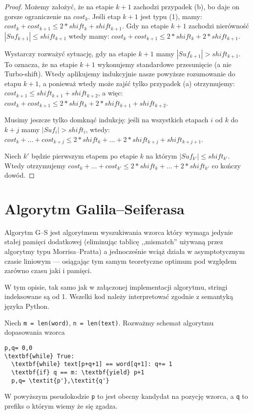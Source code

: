 \begin{proof}
	Możemy założyć, że na etapie $k+1$ zachodzi przypadek (b), bo daje on gorsze ograniczenie na $cost_k$. Jeśli etap $k+1$ jest typu (1), mamy: $cost_k + cost_{k+1} \leq 2 * shift_k + shift_{k+1}$. Gdy na etapie $k+1$ zachodzi nierówność $|Suf_{k+1}| \leq shift_{k+1}$ wtedy mamy: $cost_k + cost_{k+1} \leq 2 * shift_k + 2* shift_{k+1}$.

	Wystarczy rozważyć sytuację, gdy na etapie $k+1$ mamy $|Suf_{k+1}| > shift_{k+1}$. To oznacza, że na etapie $k+1$ wykonujemy standardowe przesunięcie (a nie Turbo-shift). Wtedy aplikujemy indukcyjnie nasze powyższe rozumowanie do etapu $k+1$, a ponieważ wtedy może zajść tylko przypadek (a) otrzymujemy: $cost_{k+1} \leq shift_{k+1} + shift_{k+2}$, a więc: $cost_k + cost_{k+1} \leq 2 * shift_k + 2*shift_{k+1} + shift_{k+2}$.

	Musimy jeszcze tylko domknąć indukcję: jeśli na wszystkich etapach $i$ od $k$ do $k+j$ mamy $|Suf_i| > shift_i$, wtedy: $cost_k + \ldots + cost_{k+j} \leq 2*shift_k + \ldots + 2*shift_{k+j} + shift_{k+j+1}$.

	Niech $k'$ będzie pierwszym etapem po etapie $k$ na którym $|Suf_{k'}| \leq shift_{k'}$. Wtedy otrzymujemy $cost_k + \ldots + cost_{k'} \leq 2*shift_k + \ldots + 2*shift_{k'}$ co kończy dowód.
\end{proof}

\section{Algorytm Galila–Seiferasa}

Algorytm G--S jest algorytmem wyszukiwania wzorca który wymaga jedynie stałej pamięci dodatkowej (eliminując tablicę ,,mismatch'' używaną przez algorytmy typu Morrisa–Pratta) a jednocześnie wciąż działa w asymptotycznym czasie liniowym — osiągając tym samym teoretyczne optimum pod względem zarówno czasu jaki i pamięci.

W tym opisie, tak samo jak w załączonej implementacji algorytmu, stringi indeksowane są od 1. Wszelki kod należy interpretować zgodnie z semantyką języka Python.

Niech \texttt{m = len(word)}, \texttt{n = len(text)}. Rozważmy schemat algorytmu dopasowania wzorca
\begin{verbatim}
p,q= 0,0
\textbf{while} True:
  \textbf{while} text[p+q+1] == word[q+1]: q+= 1
  \textbf{if} q == m: \textbf{yield} p+1
  p,q= \textit{p'},\textit{q'}
\end{verbatim}
W powyższym pseudokodzie \texttt{p} to jest obecny kandydat na pozycję wzorca, a \texttt{q} to prefiks o którym wiemy że się zgadza.

